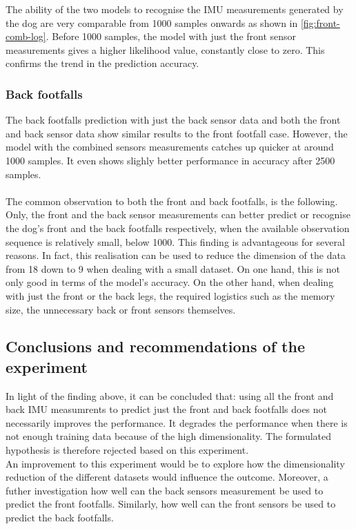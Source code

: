 The ability of the two models to recognise the IMU measurements generated by the dog are very comparable from 1000 samples onwards as shown in \ref{fig:front-comb-log}. Before 1000 samples, the model with just the front sensor measurements gives a higher likelihood value, constantly close to zero. This confirms the trend in the prediction accuracy.

\subsubsection{Back footfalls}

The back footfalls prediction with just the back sensor data and both the front and back sensor data show similar results to the front footfall case. However, the model with the combined sensors measurements catches up quicker at around 1000 samples. It even shows slighly better performance in accuracy after 2500 samples.\\\\
The common observation to both the front and back footfalls, is the following. Only, the front and the back sensor measurements can better predict or recognise the dog's front and the back footfalls respectively, when the available observation sequence is relatively small, below 1000.
This finding is advantageous for several reasons. In fact, this realisation can be used to reduce the dimension of the data from 18 down to 9 when dealing with a small dataset. On one hand, this is not only good in terms of the model's accuracy. On the other hand, when dealing with just the front or the back legs, the required logistics such as the memory size, the unnecessary back or front sensors themselves. 

\subsection{Conclusions and recommendations of the experiment}
In light of the finding above, it can be concluded that: using all the front and back IMU measumrents to predict just the front and back footfalls does not necessarily improves the performance. It degrades the performance when there is not enough training data because of the high dimensionality.
The formulated hypothesis is therefore rejected based on this experiment.\\
An improvement to this experiment would be to explore how the dimensionality reduction of the different datasets would influence the outcome. Moreover, a futher investigation how well can the back sensors measurement be used to predict the front footfalls. Similarly, how well can the front sensors be used to predict the back footfalls.

